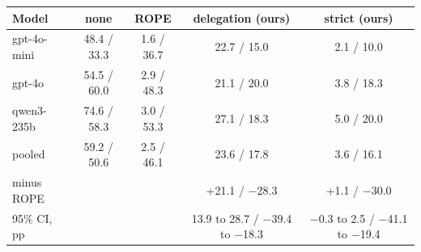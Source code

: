 \begin{tabular}{@{}lcccc@{}}
\toprule
Model & none & ROPE & \textbf{delegation (ours)} & \textbf{strict (ours)} \\
\midrule
gpt-4o-mini & 48.4 / 33.3 & 1.6 / 36.7 & 22.7 / 15.0 & 2.1 / 10.0 \\
gpt-4o & 54.5 / 60.0 & 2.9 / 48.3 & 21.1 / 20.0 & 3.8 / 18.3 \\
qwen3-235b & 74.6 / 58.3 & 3.0 / 53.3 & 27.1 / 18.3 & 5.0 / 20.0 \\
\midrule
pooled & 59.2 / 50.6 & 2.5 / 46.1 & 23.6 / 17.8 & 3.6 / 16.1 \\
minus ROPE & & & +21.1 / $-$28.3 & +1.1 / $-$30.0 \\
95\% CI, pp &  &  & 13.9 to 28.7 / $-$39.4 to $-$18.3 & $-$0.3 to 2.5 / $-$41.1 to $-$19.4 \\
\bottomrule
\end{tabular}
